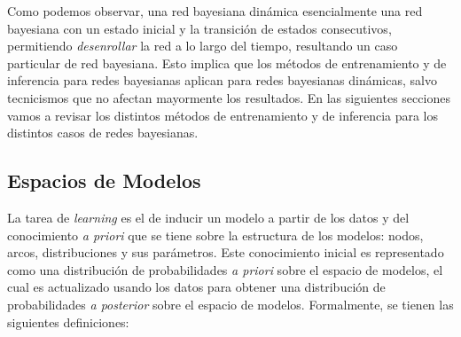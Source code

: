 Como podemos observar, una red bayesiana dinámica esencialmente una red bayesiana con un estado inicial y la transición de estados consecutivos, permitiendo \emph{desenrollar} la red a lo largo del tiempo, resultando un caso particular de red bayesiana. Esto implica que los métodos de entrenamiento y de inferencia para redes bayesianas aplican para redes bayesianas dinámicas, salvo tecnicismos que no afectan mayormente los resultados. En las siguientes secciones vamos a revisar los distintos métodos de entrenamiento y de inferencia para los distintos casos de redes bayesianas.



\subsection{Espacios de Modelos}

La tarea de \emph{learning} es el de inducir un modelo a partir de los datos y del conocimiento \emph{a priori} que se tiene sobre la estructura de los modelos: nodos, arcos, distribuciones y sus parámetros. Este conocimiento inicial es representado como una distribución de probabilidades \emph{a priori }sobre el espacio de modelos, el cual es actualizado usando los datos para obtener una distribución de probabilidades \emph{a posterior} sobre el espacio de modelos. Formalmente, se tienen las siguientes definiciones:

